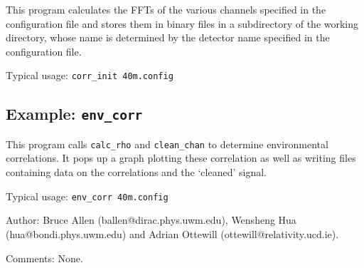 This program calculates the FFTs of the various channels specified in
the configuration file and stores them in binary files in a
subdirectory of the working directory, whose name is determined by the
detector name specified in the configuration file.

\begin{description}
\item{Typical usage:} {\tt corr\_init 40m.config}
\end{description}


\clearpage

\subsection{Example: {\tt env\_corr} }

This program calls {\tt calc\_rho} and {\tt clean\_chan} to determine
environmental correlations. It pops up a graph plotting these 
correlation as well as writing files containing data on the
correlations
and the `cleaned' signal.



\begin{description}
\item{Typical usage:} {\tt env\_corr  40m.config}
\end{description}



\begin{description}
\item{Author:}
Bruce Allen (ballen@dirac.phys.uwm.edu), Wensheng Hua (hua@bondi.phys.uwm.edu)
  and Adrian Ottewill (ottewill@relativity.ucd.ie).
\item{Comments:} None.
\end{description}

\clearpage
